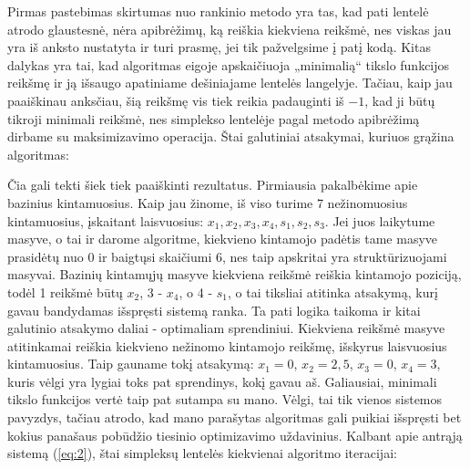 \documentclass{article}
\begin{document}
Pirmas pastebimas skirtumas nuo rankinio metodo yra tas, kad pati lentelė atrodo glaustesnė, nėra apibrėžimų, ką reiškia kiekviena reikšmė, nes viskas jau yra iš anksto nustatyta ir turi prasmę, jei tik pažvelgsime į patį kodą. Kitas dalykas yra tai, kad algoritmas eigoje apskaičiuoja „minimalią“ tikslo funkcijos reikšmę ir ją išsaugo apatiniame dešiniajame lentelės langelyje. Tačiau, kaip jau paaiškinau anksčiau, šią reikšmę vis tiek reikia padauginti iš $-1$, kad ji būtų tikroji minimali reikšmė, nes simplekso lentelėje pagal metodo apibrėžimą dirbame su maksimizavimo operacija.
Štai galutiniai atsakymai, kuriuos grąžina algoritmas:
\begin{table}[H]
    \centering
    \caption{Pirmos sistemos (\ref{eq:1}) galutiniai rezultatai}
    \label{table:7}
\end{table}
Čia gali tekti šiek tiek paaiškinti rezultatus. Pirmiausia pakalbėkime apie bazinius kintamuosius. Kaip jau žinome, iš viso turime 7 nežinomuosius kintamuosius, įskaitant laisvuosius: $x_1, x_2, x_3, x_4, s_1, s_2, s_3$. Jei juos laikytume masyve, o tai ir darome algoritme, kiekvieno kintamojo padėtis tame masyve prasidėtų nuo 0 ir baigtųsi skaičiumi 6, nes taip apskritai yra struktūrizuojami masyvai. Bazinių kintamųjų masyve kiekviena reikšmė reiškia kintamojo poziciją, todėl 1 reikšmė būtų $x_2$, 3 - $x_4$, o 4 - $s_1$, o tai tiksliai atitinka atsakymą, kurį gavau bandydamas išspręsti sistemą ranka. Ta pati logika taikoma ir kitai galutinio atsakymo daliai - optimaliam sprendiniui. Kiekviena reikšmė masyve atitinkamai reiškia kiekvieno nežinomo kintamojo reikšmę, išskyrus laisvuosius kintamuosius. Taip gauname tokį atsakymą: $x_1=0$, $x_2=2,5$, $x_3=0$, $x_4=3$, kuris vėlgi yra lygiai toks pat sprendinys, kokį gavau aš. Galiausiai, minimali tikslo funkcijos vertė taip pat sutampa su mano. Vėlgi, tai tik vienos sistemos pavyzdys, tačiau atrodo, kad mano parašytas algoritmas gali puikiai išspręsti bet kokius panašaus pobūdžio tiesinio optimizavimo uždavinius.
Kalbant apie antrąją sistemą (\ref{eq:2}), štai simpleksų lentelės kiekvienai algoritmo iteracijai:
\end{document}
